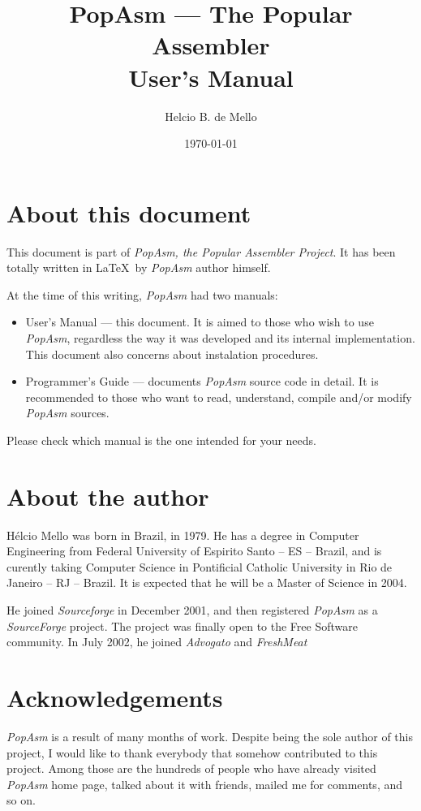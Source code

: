 \documentclass[a4paper,12pt]{book}
\title{PopAsm --- The Popular Assembler\\User's Manual}
\author{Helcio B. de Mello}
\date{\today}
\begin{document}
\maketitle

\chapter*{About this document}
This document is part of \emph{PopAsm, the Popular Assembler Project}. It has been totally written in \LaTeX\ by
\emph{PopAsm} author himself.

At the time of this writing, \emph{PopAsm} had two manuals:

\begin{itemize}
	\item{User's Manual} --- this document. It is aimed to those who wish to use \emph{PopAsm}, regardless the way
		it was developed and its internal implementation. This document also concerns about instalation procedures.
	\item{Programmer's Guide} --- documents \emph{PopAsm} source code in detail. It is recommended to those who
		want to read, understand, compile and/or modify \emph{PopAsm} sources.
\end{itemize}

Please check which manual is the one intended for your needs.

\chapter*{About the author}
H\'elcio Mello was born in Brazil, in 1979. He has a degree in Computer Engineering from Federal University of
Espirito Santo -- ES -- Brazil\cite{UFES}, and is curently taking Computer Science in Pontificial Catholic
University in Rio de Janeiro -- RJ -- Brazil\cite{PUC}. It is expected that he will be a Master of Science in 2004.

He joined \emph{Sourceforge}\cite{SF} in December 2001, and then registered \emph{PopAsm} as a \emph{SourceForge}
project. The project was finally open to the Free Software community. In July 2002, he joined \emph{Advogato}
\cite{ADV}\cite{ADVPRSN} and \emph{FreshMeat}\cite{FRESH}

\chapter*{Acknowledgements}
\emph{PopAsm} is a result of many months of work. Despite being the sole author of this project, I would like to
thank everybody that somehow contributed to this project. Among those are the hundreds of people who have already
visited \emph{PopAsm} home page, talked about it with friends, mailed me for comments, and so on.
\end{document}
